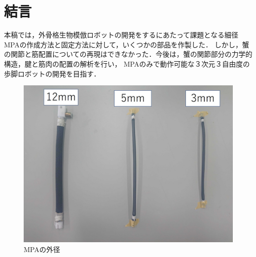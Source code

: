 \documentclass{jarticle}
\begin{document}
\vspace*{-2mm}
\section{結言}

本稿では，外骨格生物模倣ロボットの開発をするにあたって課題となる細径MPAの作成方法と固定方法に対して，いくつかの部品を作製した．
しかし，蟹の関節と筋配置についての再現はできなかった．今後は，蟹の関節部分の力学的構造，腱と筋肉の配置の解析を行い，
MPAのみで動作可能な３次元３自由度の歩脚ロボットの開発を目指す．



\begin{figure}[t]
  \begin{minipage}[b]{0.47\columnwidth}
    \centering
    \includegraphics[scale=0.15]{mpa.JPG}
    \vspace{-6.5mm}
    \caption{MPAの外径}
    \label{fig:MPA}
  \end{minipage}
  \hspace{0.04\columnwidth}
  \begin{minipage}[b]{0.47\columnwidth}
    \centering

\end{minipage}
\end{figure}
\end{document}
